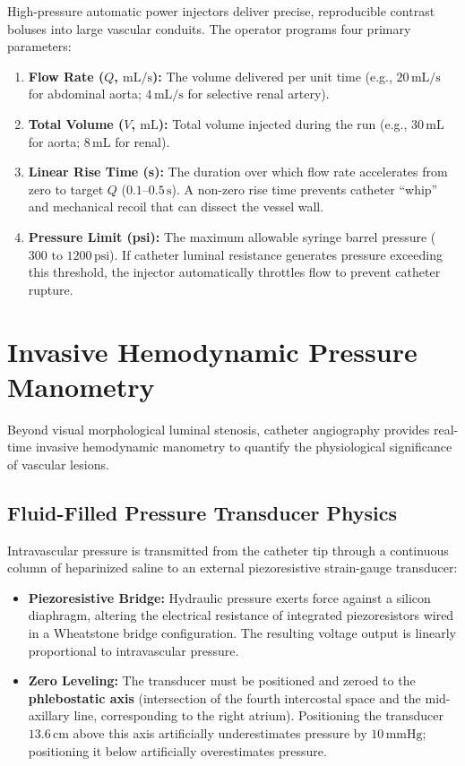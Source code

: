 \documentclass[11pt,a4paper]{article}
\begin{document}
High-pressure automatic power injectors deliver precise, reproducible contrast boluses into large vascular conduits. The operator programs four primary parameters:
\begin{enumerate}[leftmargin=*]
    \item \textbf{Flow Rate ($Q$, $\text{mL/s}$):} The volume delivered per unit time (e.g., $20\,\text{mL/s}$ for abdominal aorta; $4\,\text{mL/s}$ for selective renal artery).
    \item \textbf{Total Volume ($V$, $\text{mL}$):} Total volume injected during the run (e.g., $30\,\text{mL}$ for aorta; $8\,\text{mL}$ for renal).
    \item \textbf{Linear Rise Time (s):} The duration over which flow rate accelerates from zero to target $Q$ ($0.1\text{--}0.5\,\text{s}$). A non-zero rise time prevents catheter ``whip'' and mechanical recoil that can dissect the vessel wall.
    \item \textbf{Pressure Limit (psi):} The maximum allowable syringe barrel pressure ($300\text{ to }1200\,\text{psi}$). If catheter luminal resistance generates pressure exceeding this threshold, the injector automatically throttles flow to prevent catheter rupture.
\end{enumerate}

\newpage
\section{Invasive Hemodynamic Pressure Manometry}

Beyond visual morphological luminal stenosis, catheter angiography provides real-time invasive hemodynamic manometry to quantify the physiological significance of vascular lesions.

\subsection{Fluid-Filled Pressure Transducer Physics}

Intravascular pressure is transmitted from the catheter tip through a continuous column of heparinized saline to an external piezoresistive strain-gauge transducer:
\begin{itemize}[leftmargin=*]
    \item \textbf{Piezoresistive Bridge:} Hydraulic pressure exerts force against a silicon diaphragm, altering the electrical resistance of integrated piezoresistors wired in a Wheatstone bridge configuration. The resulting voltage output is linearly proportional to intravascular pressure.
    \item \textbf{Zero Leveling:} The transducer must be positioned and zeroed to the \textbf{phlebostatic axis} (intersection of the fourth intercostal space and the mid-axillary line, corresponding to the right atrium). Positioning the transducer $13.6\,\text{cm}$ above this axis artificially underestimates pressure by $10\,\text{mmHg}$; positioning it below artificially overestimates pressure.
\end{itemize}
\end{document}
